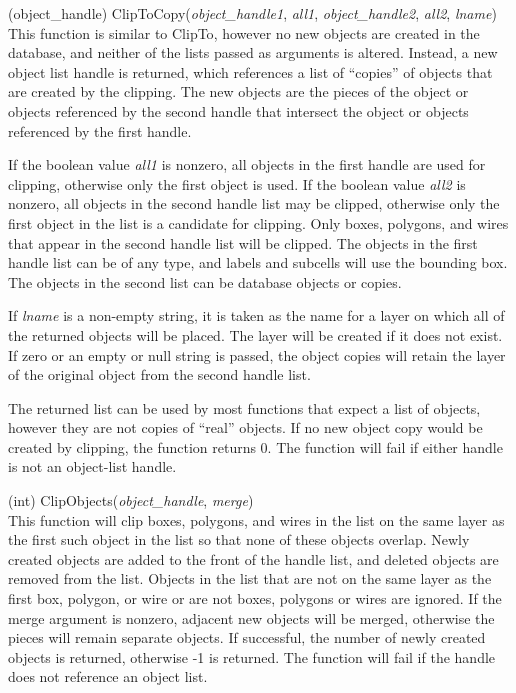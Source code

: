 \begin{description}
\item{(object\_handle) \vt ClipToCopy({\it object\_handle1}, {\it all1\/},
  {\it object\_handle2}, {\it all2\/}, {\it lname})}\\
This function is similar to {\vt ClipTo}, however no new objects are
created in the database, and neither of the lists passed as arguments
is altered.  Instead, a new object list handle is returned, which
references a list of ``copies'' of objects that are created by the
clipping.  The new objects are the pieces of the object or objects
referenced by the second handle that intersect the object or objects
referenced by the first handle.

If the boolean value {\it all1} is nonzero, all objects in the first
handle are used for clipping, otherwise only the first object is used. 
If the boolean value {\it all2} is nonzero, all objects in the second
handle list may be clipped, otherwise only the first object in the
list is a candidate for clipping.  Only boxes, polygons, and wires
that appear in the second handle list will be clipped.  The objects in
the first handle list can be of any type, and labels and subcells will
use the bounding box.  The objects in the second list can be database
objects or copies.

If {\it lname} is a non-empty string, it is taken as the name for a
layer on which all of the returned objects will be placed.  The layer
will be created if it does not exist.  If zero or an empty or null
string is passed, the object copies will retain the layer of the
original object from the second handle list.

The returned list can be used by most functions that expect a list of
objects, however they are not copies of ``real'' objects.  If no new
object copy would be created by clipping, the function returns 0.  The
function will fail if either handle is not an object-list handle.

\item{(int) \vt ClipObjects({\it object\_handle\/}, {\it merge\/})}\\
This function will clip boxes, polygons, and wires in the list on the
same layer as the first such object in the list so that none of these
objects overlap.  Newly created objects are added to the front of the
handle list, and deleted objects are removed from the list.  Objects
in the list that are not on the same layer as the first box, polygon,
or wire or are not boxes, polygons or wires are ignored.  If the merge
argument is nonzero, adjacent new objects will be merged, otherwise
the pieces will remain separate objects.  If successful, the number of
newly created objects is returned, otherwise -1 is returned.  The
function will fail if the handle does not reference an object list.


\end{description}
